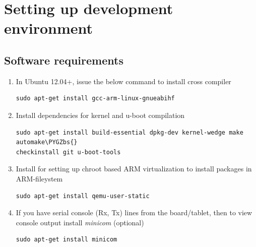 \documentclass[letterpaper,10pt,english]{sphinxmanual}
\def\PYGZbs{\char`\\}
\begin{document}
\begin{DUlineblock}{0em}
\item[] 
\end{DUlineblock}


\chapter{Setting up development environment}
\label{embedded-linux:setting-up-development-environment}

\section{Software requirements}
\label{embedded-linux:software-requirements}\begin{enumerate}
\item {} 
In Ubuntu 12.04+, issue the below command to install cross compiler

\begin{Verbatim}[commandchars=\\\{\}]
sudo apt-get install gcc-arm-linux-gnueabihf
\end{Verbatim}

\item {} 
Install dependencies for kernel and u-boot compilation

\begin{Verbatim}[commandchars=\\\{\}]
sudo apt-get install build-essential dpkg-dev kernel-wedge make automake\PYGZbs{}
checkinstall git u-boot-tools
\end{Verbatim}

\item {} 
Install  for setting up chroot based ARM virtualization to
install packages in ARM-fileystem

\begin{Verbatim}[commandchars=\\\{\}]
sudo apt-get install qemu-user-static
\end{Verbatim}

\item {} 
If you have serial console (Rx, Tx) lines from the board/tablet, then to
view console output install \emph{minicom} (optional)

\begin{Verbatim}[commandchars=\\\{\}]
sudo apt-get install minicom
\end{Verbatim}

\end{enumerate}
\end{document}
